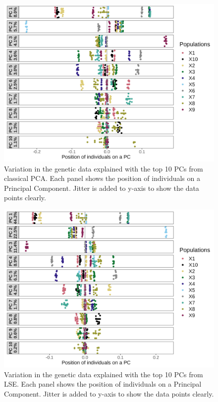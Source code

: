 \documentclass[12pt, letterpaper]{article}
\begin{document}
\begin{figure}[ht!]
    \includegraphics[width=16.5cm]{Images/Supplement/pcaplot2.png}
    \centering
    \caption{Variation in the genetic data explained with the top 10 PCs from classical PCA. Each panel shows the position of individuals on a Principal Component. Jitter is added to y-axis to show the data points clearly.}
    \label{figS1:pc_scale}
\end{figure}

\begin{figure}[ht!]
    \includegraphics[width=16.5cm]{Images/Supplement/lseplot2.png}
    \centering
    \caption{Variation in the genetic data explained with the top 10 PCs from LSE. Each panel shows the position of individuals on a Principal Component. Jitter is added to y-axis to show the data points clearly.}
    \label{figS1:pc_scale}
\end{figure}
\end{document}
